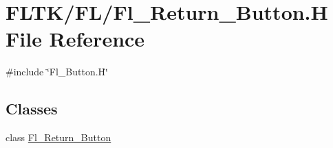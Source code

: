 \hypertarget{_fl___return___button_8_h}{}\section{F\+L\+T\+K/\+F\+L/\+Fl\+\_\+\+Return\+\_\+\+Button.H File Reference}
\label{_fl___return___button_8_h}
{\ttfamily \#include \char`\"{}Fl\+\_\+\+Button.\+H\char`\"{}}\newline
\subsection*{Classes}
\begin{DoxyCompactItemize}
\item 
class \hyperlink{class_fl___return___button}{Fl\+\_\+\+Return\+\_\+\+Button}
\end{DoxyCompactItemize}
